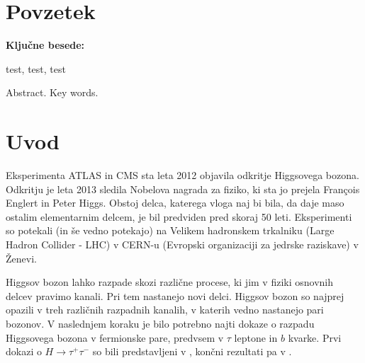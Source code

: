 \documentclass[11pt,a4paper,openany]{book}
\begin{document}










\chapter*{Povzetek}



\vspace{1.3cm}
\noindent
{\large \bf Ključne besede:}

\vspace{0.5cm}
\noindent test, test, test


Abstract. Key words.







\chapter*{Uvod}

Eksperimenta ATLAS in CMS sta leta 2012 objavila odkritje Higgsovega bozona\cite{Aad20121,Chatrchyan201230}. Odkritju je leta 2013 sledila Nobelova nagrada za fiziko, ki sta jo prejela François Englert in Peter Higgs. Obstoj delca, katerega vloga naj bi bila, da daje maso ostalim elementarnim delcem, je bil predviden pred skoraj 50 leti. Eksperimenti so potekali (in še vedno potekajo) na Velikem hadronskem trkalniku (Large Hadron Collider - LHC) v CERN-u (Evropski organizaciji za jedrske raziskave) v Ženevi\cite{ChallengeDoc}.

Higgsov bozon lahko razpade skozi različne procese, ki jim v fiziki osnovnih delcev pravimo kanali. Pri tem nastanejo novi delci. Higgsov bozon so najprej opazili v treh različnih razpadnih kanalih, v katerih vedno nastanejo pari bozonov. V naslednjem koraku je bilo potrebno najti dokaze o razpadu Higgsovega bozona v fermionske pare, predvsem v $\tau$ leptone in $b$ kvarke. Prvi dokazi o $H \rightarrow \tau^+\tau^-$ so bili predstavljeni v \cite{atlas2013}, končni rezultati pa v \cite{atlas2015htautau}.
\end{document}
